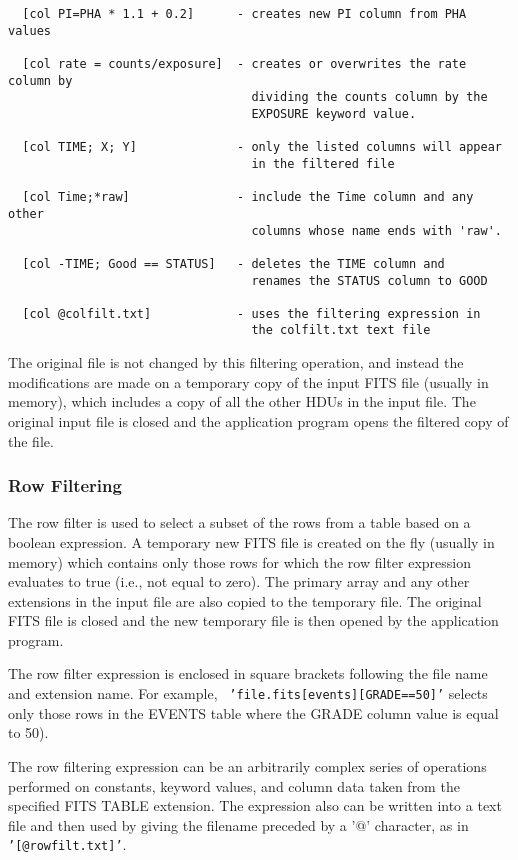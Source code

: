 \documentclass[11pt]{article}
\begin{document}
\begin{verbatim}
  [col PI=PHA * 1.1 + 0.2]      - creates new PI column from PHA values

  [col rate = counts/exposure]  - creates or overwrites the rate column by
                                  dividing the counts column by the
                                  EXPOSURE keyword value.

  [col TIME; X; Y]              - only the listed columns will appear
                                  in the filtered file

  [col Time;*raw]               - include the Time column and any other
                                  columns whose name ends with 'raw'.

  [col -TIME; Good == STATUS]   - deletes the TIME column and
                                  renames the STATUS column to GOOD

  [col @colfilt.txt]            - uses the filtering expression in
                                  the colfilt.txt text file
\end{verbatim}

The original file is not changed by this filtering operation, and
instead the modifications are made on a temporary copy of the input
FITS file (usually in memory), which includes a copy of all the other
HDUs in the input file.   The original input file is closed and the
application program opens the filtered copy of the file.

\subsubsection{Row Filtering}

The row filter is used to select a subset of the rows from a table
based on a boolean expression.  A temporary new FITS file is created on
the fly (usually in memory) which contains only those rows for which
the row filter expression evaluates to true (i.e., not equal to zero).
The primary array and any other extensions in the input file are also
copied to the temporary file.  The original FITS file is closed and the
new temporary file is then opened by the application program.

The row filter expression is enclosed in square brackets following the
file name and extension name.  For example, {\tt
'file.fits[events][GRADE==50]'}  selects only those rows in the EVENTS
table where the GRADE column value is equal to 50).

The row filtering  expression can be an arbitrarily  complex series of
operations performed  on constants,  keyword values,  and column data
taken from the specified FITS TABLE extension.  The expression 
also can be written into a text file and then used by giving the
filename preceded by a '@' character, as in
{\tt '[@rowfilt.txt]'}.
\end{document}
